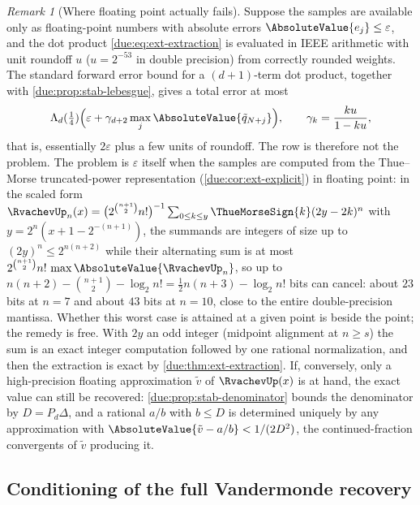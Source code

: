\documentclass[11pt,oneside]{article}
\theoremstyle{plain}
\theoremstyle{definition}
\theoremstyle{remark}
\newtheorem{remark}[theorem]{Remark}
\newcommand{\upn}[1]{\RvachevUp_{#1}}
\begin{document}
\begin{remark}[Where floating point actually fails]
\label{due:rmk:stab-float}
Suppose the samples are available only as floating-point numbers with
absolute errors $\AbsoluteValue{e_{j}}\le\varepsilon$, and the dot product
\cref{due:eq:ext-extraction} is evaluated in IEEE arithmetic with unit
roundoff $u$ ($u=2^{-53}$ in double precision) from correctly rounded weights.
The standard forward error bound for a $(d+1)$-term dot product, together with
\cref{due:prop:stab-lebesgue}, gives a total error at most
\[
 \Lambda_{d}(\tfrac14)\Bigl(\varepsilon+\gamma_{d+2}\max_{j}\AbsoluteValue{\tilde q_{N+j}}\Bigr),
 \qquad\gamma_{k}=\frac{ku}{1-ku},
\]
that is, essentially $2\varepsilon$ plus a few units of roundoff.  The row is
therefore not the problem.  The problem is $\varepsilon$ itself when the
samples are computed from the Thue--Morse truncated-power representation
(\cref{due:cor:ext-explicit}) in floating point: in the scaled form
$\upn{n}(x)=\bigl(2^{\binom{n+1}{2}}n!\bigr)^{-1}\sum_{0\le k\le y}
\ThueMorseSign{k}(2y-2k)^{n}$ with $y=2^{n}(x+1-2^{-(n+1)})$, the summands are
integers of size up to $(2y)^{n}\le2^{n(n+2)}$ while their alternating sum is
at most $2^{\binom{n+1}{2}}n!\,\max\AbsoluteValue{\upn{n}}$, so up to
$n(n+2)-\binom{n+1}{2}-\log_{2}n!=\tfrac12n(n+3)-\log_{2}n!$ bits can cancel:
about $23$ bits at $n=7$ and about $43$ bits at $n=10$, close to the entire
double-precision mantissa.  Whether this worst case is attained at a given
point is beside the point; the remedy is free.  With $2y$ an odd integer
(midpoint alignment at $n\ge s$) the sum is an exact integer computation
followed by one rational normalization, and then the extraction is exact by
\cref{due:thm:ext-extraction}.  If, conversely, only a high-precision
floating approximation $\tilde v$ of $\RvachevUp(x)$ is at hand, the exact
value can still be recovered: \cref{due:prop:stab-denominator} bounds the
denominator by $D=P_{d}\Delta$, and a rational $a/b$ with $b\le D$ is
determined uniquely by any approximation with
$\AbsoluteValue{\tilde v-a/b}<1/(2D^{2})$, the continued-fraction convergents
of $\tilde v$ producing it.
\end{remark}

\subsection{Conditioning of the full Vandermonde recovery}
\end{document}
